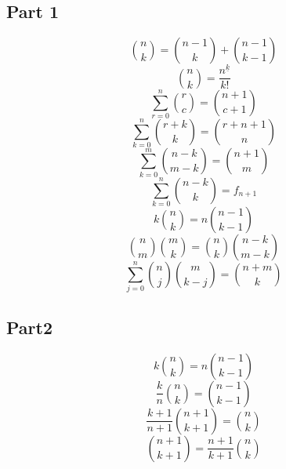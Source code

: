 
\subsection{Part 1}\label{subsec:part-1}
\begin{equation}
    \binom{n}{k} = \binom{n-1}{k} + \binom{n-1}{k-1}
\end{equation}
\begin{equation}
    \binom{n}{k} = \frac{n^{\underline{k}}}{k!}
\end{equation}
\begin{equation}
    \sum_{r=0}^{n} \binom{r}{c} = \binom{n+1}{c+1}
\end{equation}
\begin{equation}
    \sum_{k=0}^{n} \binom{r+k}{k} = \binom{r+n+1}{n}
\end{equation}
\begin{equation}
    \sum_{k=0}^{m} \binom{n-k}{m-k} = \binom{n+1}{m}
\end{equation}
\begin{equation}
    \sum_{k=0}^{n} \binom{n-k}{k} = f_{n+1}
\end{equation}
\begin{equation}
    k \binom{n}{k} = n \binom{n-1}{k-1}
\end{equation}
\begin{equation}
    \binom{n}{m} \binom{m}{k} = \binom{n}{k} \binom{n-k}{m-k}
\end{equation}
\begin{equation}
    \sum_{j=0}^{n} \binom{n}{j} \binom{m}{k-j} = \binom{n+m}{k}
\end{equation}

\subsection{Part2}\label{subsec:part2}
\begin{equation}
    k \binom{n}{k} = n \binom{n-1}{k-1}
\end{equation}
\begin{equation}
    \frac{k}{n} \binom{n}{k} = \binom{n-1}{k-1}
\end{equation}
\begin{equation}
    \frac{k+1}{n+1} \binom{n+1}{k+1} = \binom{n}{k}
\end{equation}
\begin{equation}
    \binom{n+1}{k+1} = \frac{n+1}{k+1} \binom{n}{k}
\end{equation}

